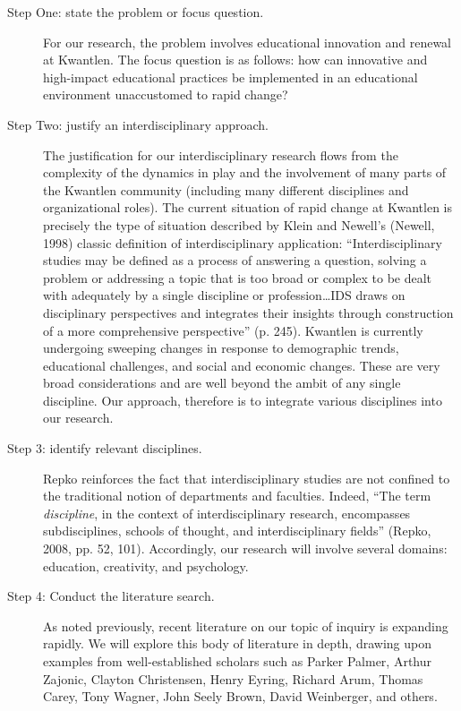 \documentclass[letterpaper,10pt,headsepline]{scrreprt}
\begin{document}
\begin{description}
\item[Step One: state the problem or focus question.] For our research, the problem
  involves educational innovation and renewal at Kwantlen. The focus question
  is as follows: how can innovative and high-impact educational practices be
  implemented in an educational environment unaccustomed to rapid change?

\item[Step Two: justify an interdisciplinary approach.] The
  justification for our interdisciplinary research flows from the complexity
  of the dynamics in play and the involvement of many parts of the Kwantlen
  community (including many different disciplines and organizational roles).
  The current situation of rapid change at Kwantlen is precisely the type of
  situation described by Klein and Newell's (Newell, 1998) classic definition
  of interdisciplinary application: ``Interdisciplinary studies may be defined
  as a process of answering a question, solving a problem or addressing a
  topic that is too broad or complex to be dealt with adequately by a single
  discipline or profession\ldots IDS draws on disciplinary perspectives and
  integrates their insights through construction of a more comprehensive
  perspective'' (p. 245). Kwantlen is currently undergoing sweeping changes in
  response to demographic trends, educational challenges, and social and
  economic changes. These are very broad considerations and are well beyond
  the ambit of any single discipline. Our approach, therefore is to integrate
  various disciplines into our research.

\item[Step 3: identify relevant disciplines.] Repko reinforces the fact that
  interdisciplinary studies are not confined to the traditional notion of
  departments and faculties. Indeed, ``The term \emph{discipline}, in the
  context of interdisciplinary research, encompasses subdisciplines, schools
  of thought, and interdisciplinary fields'' (Repko, 2008, pp. 52, 101).
  Accordingly, our research will involve several domains: education,
  creativity, and psychology.

\item[Step 4: Conduct the literature search.] As noted previously, recent
  literature on our topic of inquiry is expanding rapidly. We will explore
  this body of literature in depth, drawing upon examples from
  well-established scholars such as Parker Palmer, Arthur Zajonic, Clayton
  Christensen, Henry Eyring, Richard Arum, Thomas Carey, Tony Wagner, John
  Seely Brown, David Weinberger, and others.


\end{description}
\end{document}
